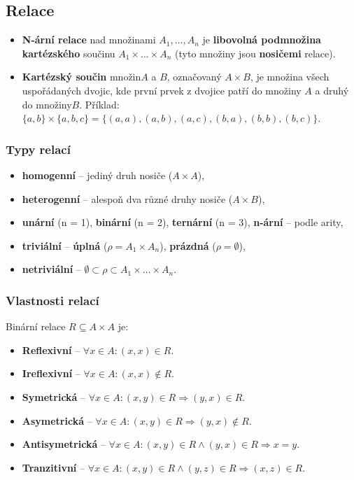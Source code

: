 \subsection{Relace}
\begin{itemize}
\item \textbf{N-ární relace} nad množinami $A_1, \ldots, A_n$ je \textbf{libovolná podmnožina kartézského} součinu $A_1 \times \ldots \times A_n$ (tyto množiny jsou \textbf{nosičemi} relace).
\item \textbf{Kartézský součin} množin$A$ a $ B $, označovaný $ A \times B $, je množina všech uspořádaných dvojic, kde první prvek z dvojice patří do množiny $ A $ a druhý do množiny$  B $. Příklad: $\{a, b\} \times \{a, b, c\} = \{(a, a), (a, b), (a, c), (b, a), (b, b), (b, c)\}$.
\end{itemize}
\subsubsection{Typy relací}
\begin{itemize}
\item \textbf{homogenní} -- jediný druh nosiče ($A \times A$),
\item \textbf{heterogenní} -- alespoň dva různé druhy nosiče ($A \times B$),
\item \textbf{unární} (n = 1), \textbf{binární} (n = 2), \textbf{ternární} (n = 3), \textbf{n-ární} -- podle arity,
\item \textbf{triviální} -- \textbf{úplná} ($\rho = A_1 \times A_n$), \textbf{prázdná} ($\rho = \emptyset$),
\item \textbf{netriviální} -- $\emptyset \subset \rho \subset A_1 \times \ldots \times A_n$.
\end{itemize}

\subsubsection{Vlastnosti relací}
Binární relace $R \subseteq A \times A$ je:

\begin{itemize}
\item \textbf{Reflexivní} -- $\forall x \in{} A: (x, x) \in{} R $.
\item \textbf{Ireflexivní} -- $\forall x \in{} A: (x, x) \notin{}R $.
\item \textbf{Symetrická} -- $\forall x \in{} A: (x, y) \in{}R \Rightarrow (y, x) \in{}R $.
\item \textbf{Asymetrická} -- $\forall x \in{} A: (x, y) \in{}R \Rightarrow (y, x) \notin{}R $.
\item \textbf{Antisymetrická} -- $\forall x \in{} A: (x, y) \in{}R \land (y, x) \in{}R \Rightarrow x = y$.
\item \textbf{Tranzitivní} -- $\forall x \in{} A: (x, y) \in{}R \land (y, z) \in{}R \Rightarrow (x,z) \in R$.
\end{itemize}

